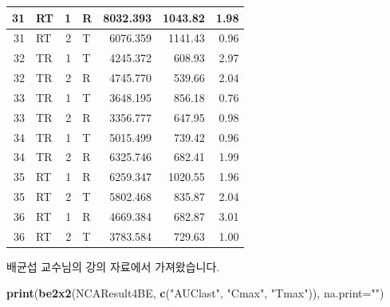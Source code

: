 \documentclass[
  10pt,
]{krantz}
\makeatletter
\newenvironment{Shaded}{\begin{snugshade}}{\end{snugshade}}
\newcommand{\DataTypeTok}[1]{\textcolor[rgb]{0.13,0.29,0.53}{#1}}
\newcommand{\KeywordTok}[1]{\textcolor[rgb]{0.13,0.29,0.53}{\textbf{#1}}}
\newcommand{\NormalTok}[1]{#1}
\newcommand{\StringTok}[1]{\textcolor[rgb]{0.31,0.60,0.02}{#1}}
\newenvironment{kframe}{%
\medskip{}
\setlength{\fboxsep}{.8em}
 \def\at@end@of@kframe{}%
 \ifinner\ifhmode%
  \def\at@end@of@kframe{\end{minipage}}%
  \begin{minipage}{\columnwidth}%
 \fi\fi%
 \def\FrameCommand##1{\hskip\@totalleftmargin \hskip-\fboxsep
 \colorbox{shadecolor}{##1}\hskip-\fboxsep
     \hskip-\linewidth \hskip-\@totalleftmargin \hskip\columnwidth}%
 \MakeFramed {\advance\hsize-\width
   \@totalleftmargin\z@ \linewidth\hsize
   \@setminipage}}%
 {\par\unskip\endMakeFramed%
 \at@end@of@kframe}
\renewenvironment{Shaded}{\begin{kframe}}{\end{kframe}}
\makeatother
\begin{document}
\begin{table}
\begin{tabular}[t]{r|l|r|l|r|r|r}
\hline
31 & RT & 1 & R & 8032.393 & 1043.82 & 1.98\\
\hline
31 & RT & 2 & T & 6076.359 & 1141.43 & 0.96\\
\hline
32 & TR & 1 & T & 4245.372 & 608.93 & 2.97\\
\hline
32 & TR & 2 & R & 4745.770 & 539.66 & 2.04\\
\hline
33 & TR & 1 & T & 3648.195 & 856.18 & 0.76\\
\hline
33 & TR & 2 & R & 3356.777 & 647.95 & 0.98\\
\hline
34 & TR & 1 & T & 5015.499 & 739.42 & 0.96\\
\hline
34 & TR & 2 & R & 6325.746 & 682.41 & 1.99\\
\hline
35 & RT & 1 & R & 6259.347 & 1020.55 & 1.96\\
\hline
35 & RT & 2 & T & 5802.468 & 835.87 & 2.04\\
\hline
36 & RT & 1 & R & 4669.384 & 682.87 & 3.01\\
\hline
36 & RT & 2 & T & 3783.584 & 729.63 & 1.00\\
\hline
\end{tabular}
\end{table}

배균섭 교수님의 강의 자료에서 가져왔습니다.

\begin{Shaded}
\begin{Highlighting}[]
\KeywordTok{print}\NormalTok{(}\KeywordTok{be2x2}\NormalTok{(NCAResult4BE, }\KeywordTok{c}\NormalTok{(}\StringTok{"AUClast"}\NormalTok{, }\StringTok{"Cmax"}\NormalTok{, }\StringTok{"Tmax"}\NormalTok{)), }\DataTypeTok{na.print=}\StringTok{""}\NormalTok{) }
\end{Highlighting}
\end{Shaded}
\end{document}
